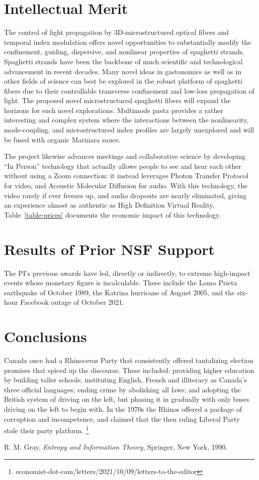 \documentclass[11pt]{article} %
\begin{document}
\section{Intellectual Merit}

The control of light propagation by 3D-microstructured optical fibers and temporal index modulation offers novel opportunities to substantially modify the confinement, guiding, dispersive, and nonlinear properties of spaghetti strands. Spaghetti strands have been the backbone of much scientific and technological advancement in recent decades. Many novel ideas in gastonomics as well as in other fields of science can best be explored in the robust platform of spaghetti fibers due to their controllable transverse confinement and low-loss propagation of light. The proposed novel microstructured spaghetti fibers will expand the horizons for such novel explorations. Multimode pasta provides a rather interesting and complex system where the interactions between the nonlinearity, mode-coupling, and microstructured index profiles are largely unexplored and will be fused with organic Marinara sauce.

The project likewise advances meetings and collaborative science by developing ``In Person'' technology that actually allows people to see and hear each other without using a Zoom connection: it instead leverages Photon Transfer Protocol for video, and Acoustic Molecular Diffusion for audio. With this technology, the video rarely if ever freezes up, and audio dropouts are nearly eliminated, giving an experience almost as authentic as High Definition Virtual Reality. Table~\ref{table-prices} documents the economic impact of this technology.

\section{Results of Prior NSF Support}

The PI's previous awards have led, directly or indirectly, to extreme high-impact events whose monetary figure is incalculable. These include the Loma Prieta earthquake of October 1989, the Katrina hurricane of August 2005, and the six-hour Facebook outage of October 2021.

\section{Conclusions}

Canada once had a Rhinoceros Party that consistently offered tantalizing election promises that spiced up the discourse. These included: providing higher education by building taller schools; instituting English, French and illiteracy as Canada's three official languages; ending crime by abolishing all laws; and adopting the British system of driving on the left, but phasing it in gradually with only buses driving on the left to begin with. In the 1970s the Rhinos offered a package of corruption and incompetence, and claimed that the then ruling Liberal Party stole their party platform.%
\footnote{economist-dot-com/letters/2021/10/09/letters-to-the-editor}

\begin{thebibliography}{9}

R. M. Gray,
\textit{Entropy and Information Theory},
Springer, New York, 1990.

\end{thebibliography}
\end{document}
